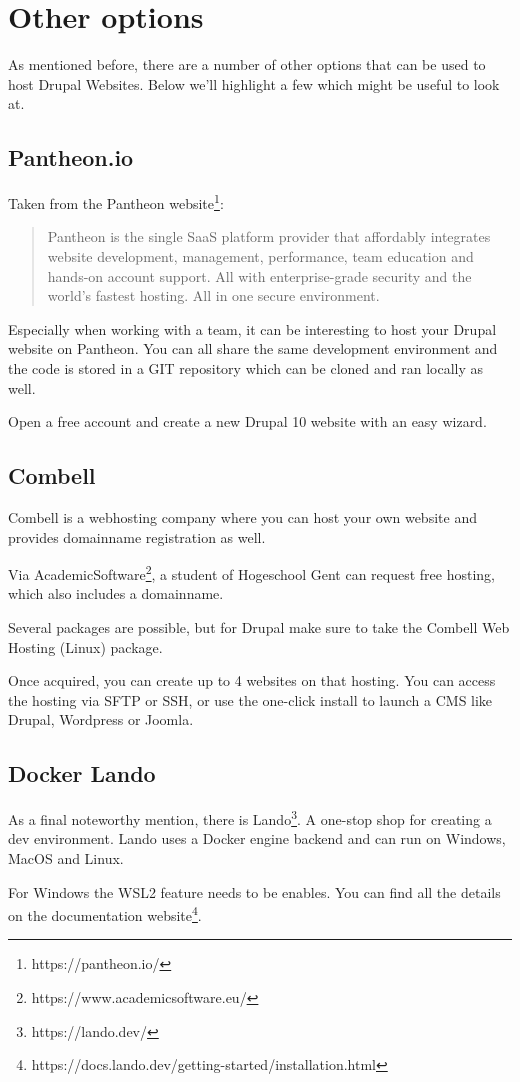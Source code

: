 \section{Other options}
As mentioned before, there are a number of other options that can be used to host Drupal Websites. Below we'll highlight a few which might be useful to look at.
\subsection{Pantheon.io}
Taken from the Pantheon website\footnote{https://pantheon.io/}:

\begin{quote}
Pantheon is the single SaaS platform provider that affordably integrates website development, management, performance, team education and hands-on account support. All with enterprise-grade security and the world's fastest hosting. All in one secure environment.
\end{quote}

Especially when working with a team, it can be interesting to host your Drupal website on Pantheon. You can all share the same development environment and the code is stored in a GIT repository which can be cloned and ran locally as well.

Open a free account and create a new Drupal 10 website with an easy wizard.

\subsection{Combell}
Combell is a webhosting company where you can host your own website and provides domainname registration as well.

Via AcademicSoftware\footnote{https://www.academicsoftware.eu/}, a student of Hogeschool Gent can request free hosting, which also includes a domainname. 

Several packages are possible, but for Drupal make sure to take the Combell Web Hosting (Linux) package. 

Once acquired, you can create up to 4 websites on that hosting. You can access the hosting via SFTP or SSH, or use the one-click install to launch a CMS like Drupal, Wordpress or Joomla.


\subsection{Docker Lando}
As a final noteworthy mention, there is Lando\footnote{https://lando.dev/}. A one-stop shop for creating a dev environment. Lando uses a Docker engine backend and can run on Windows, MacOS and Linux.

For Windows the WSL2 feature needs to be enables. You can find all the details on the documentation website\footnote{https://docs.lando.dev/getting-started/installation.html}.




